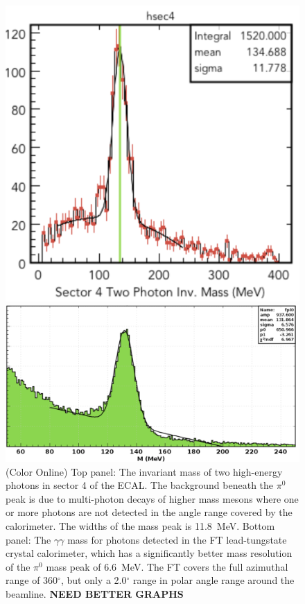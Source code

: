 \documentclass[final,3p,twocolumn]{elsarticle}
\begin{document}
\begin{figure}[htbp!]
\centerline{\includegraphics[width=0.95\columnwidth]{pi0.png}}
\centerline{\includegraphics[width=0.9\columnwidth]{ft-pi0.png}}
\caption{(Color Online) Top panel: The invariant mass of two high-energy photons in sector 4 of the ECAL. The background beneath
the $\pi^0$ peak is due to multi-photon decays of higher mass mesons where one or more photons are not detected
in the angle range covered by the calorimeter. The widths of the mass peak is 11.8~MeV. Bottom panel: The
$\gamma\gamma$ mass for photons detected in the FT lead-tungstate crystal calorimeter, which has a significantly
better mass resolution of the $\pi^0$ mass peak of 6.6~MeV. The FT covers the full azimuthal range of 360$^\circ$, 
but only a 2.0$^\circ$ range in polar angle range around the beamline. {\bf NEED BETTER GRAPHS}} 
\label{gg}
\end{figure}
\end{document}
